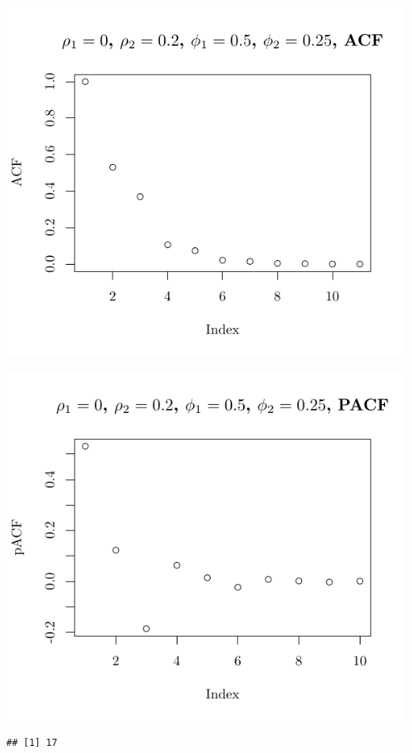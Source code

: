 \documentclass[10pt]{paper}\usepackage[]{graphicx}\usepackage[]{color}
\makeatletter
\def\maxwidth{ %
  \ifdim\Gin@nat@width>\linewidth
    \linewidth
  \else
    \Gin@nat@width
  \fi
}
\newenvironment{kframe}{%
 \def\at@end@of@kframe{}%
 \ifinner\ifhmode%
  \def\at@end@of@kframe{\end{minipage}}%
  \begin{minipage}{\columnwidth}%
 \fi\fi%
 \def\FrameCommand##1{\hskip\@totalleftmargin \hskip-\fboxsep
 \colorbox{shadecolor}{##1}\hskip-\fboxsep
     \hskip-\linewidth \hskip-\@totalleftmargin \hskip\columnwidth}%
 \MakeFramed {\advance\hsize-\width
   \@totalleftmargin\z@ \linewidth\hsize
   \@setminipage}}%
 {\par\unskip\endMakeFramed%
 \at@end@of@kframe}
\newenvironment{knitrout}{}{} %
\makeatother
\begin{document}
\begin{knitrout}
{\centering \includegraphics[width=\maxwidth]{figure/graphics-plotter-95} 

}




{\centering \includegraphics[width=\maxwidth]{figure/graphics-plotter-96} 

}


\begin{kframe}\begin{verbatim}
## [1] 17
\end{verbatim}
\end{kframe}


\end{knitrout}
\end{document}

